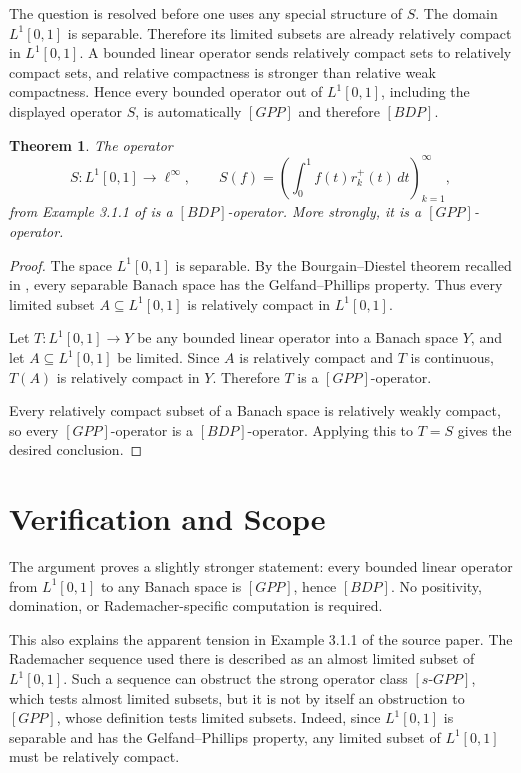 \documentclass[11pt]{article}
\newtheorem{theorem}{Theorem}
\begin{document}
The question is resolved before one uses any special structure of \(S\). The
domain \(L^1[0,1]\) is separable. Therefore its limited subsets are already
relatively compact in \(L^1[0,1]\). A bounded linear operator sends relatively
compact sets to relatively compact sets, and relative compactness is stronger
than relative weak compactness. Hence every bounded operator out of
\(L^1[0,1]\), including the displayed operator \(S\), is automatically
\([GPP]\) and therefore \([BDP]\).

\begin{theorem}
The operator
\[
  S:L^1[0,1]\to \ell^\infty,\qquad
  S(f)=\left(\int_0^1 f(t)r_k^+(t)\,dt\right)_{k=1}^{\infty},
\]
from Example 3.1.1 of \cite{EG2022} is a \([BDP]\)-operator. More strongly,
it is a \([GPP]\)-operator.
\end{theorem}

\begin{proof}
The space \(L^1[0,1]\) is separable. By the Bourgain--Diestel theorem recalled
in \cite{EG2022}, every separable Banach space has the Gelfand--Phillips
property. Thus every limited subset \(A\subseteq L^1[0,1]\) is relatively
compact in \(L^1[0,1]\).

Let \(T:L^1[0,1]\to Y\) be any bounded linear operator into a Banach space
\(Y\), and let \(A\subseteq L^1[0,1]\) be limited. Since \(A\) is relatively
compact and \(T\) is continuous, \(T(A)\) is relatively compact in \(Y\).
Therefore \(T\) is a \([GPP]\)-operator.

Every relatively compact subset of a Banach space is relatively weakly
compact, so every \([GPP]\)-operator is a \([BDP]\)-operator. Applying this
to \(T=S\) gives the desired conclusion.
\end{proof}

\section*{Verification and Scope}

The argument proves a slightly stronger statement: every bounded linear
operator from \(L^1[0,1]\) to any Banach space is \([GPP]\), hence \([BDP]\).
No positivity, domination, or Rademacher-specific computation is required.

This also explains the apparent tension in Example 3.1.1 of the source paper.
The Rademacher sequence used there is described as an almost limited subset of
\(L^1[0,1]\). Such a sequence can obstruct the strong operator class
\([s\text{-}GPP]\), which tests almost limited subsets, but it is not by
itself an obstruction to \([GPP]\), whose definition tests limited subsets.
Indeed, since \(L^1[0,1]\) is separable and has the Gelfand--Phillips property,
any limited subset of \(L^1[0,1]\) must be relatively compact.
\end{document}
